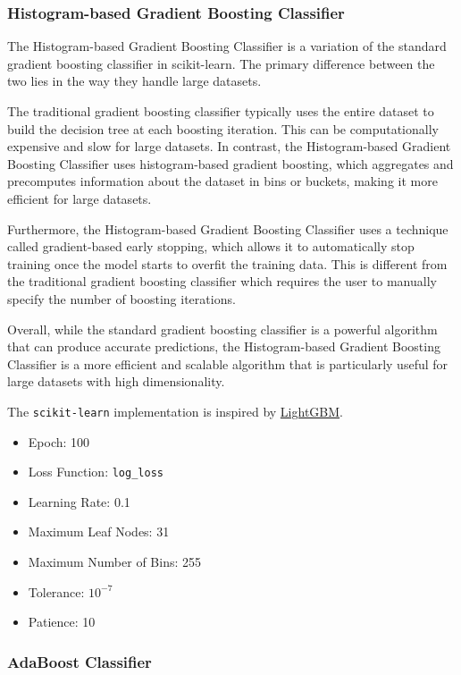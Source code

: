 \documentclass[twocolumn]{extarticle}
\begin{document}
\subsubsection{Histogram-based Gradient Boosting Classifier}

The Histogram-based Gradient Boosting Classifier is a variation of the standard gradient boosting classifier in scikit-learn. The primary difference between the two lies in the way they handle large datasets.

The traditional gradient boosting classifier typically uses the entire dataset to build the decision tree at each boosting iteration. This can be computationally expensive and slow for large datasets. In contrast, the Histogram-based Gradient Boosting Classifier uses histogram-based gradient boosting, which aggregates and precomputes information about the dataset in bins or buckets, making it more efficient for large datasets.

Furthermore, the Histogram-based Gradient Boosting Classifier uses a technique called gradient-based early stopping, which allows it to automatically stop training once the model starts to overfit the training data. This is different from the traditional gradient boosting classifier which requires the user to manually specify the number of boosting iterations.

Overall, while the standard gradient boosting classifier is a powerful algorithm that can produce accurate predictions, the Histogram-based Gradient Boosting Classifier is a more efficient and scalable algorithm that is particularly useful for large datasets with high dimensionality.

The \texttt{scikit-learn} implementation is inspired by \href{https://github.com/Microsoft/LightGBM}{LightGBM}.

\begin{itemize}
\item Epoch: 100
\item Loss Function: \texttt{log\_loss}
\item Learning Rate: 0.1
\item Maximum Leaf Nodes: 31
\item Maximum Number of Bins: 255
\item Tolerance: $10^{-7}$
\item Patience: 10
\end{itemize}

\subsubsection{AdaBoost Classifier}
\end{document}
